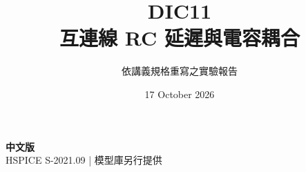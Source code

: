 \documentclass[11pt,a4paper]{article}
\title{\color{accent}DIC11\\[4pt]互連線 RC 延遲與電容耦合}
\author{依講義規格重寫之實驗報告}
\date{17 October 2026}
\begin{document}
\maketitle
\begin{center}\small\textbf{中文版}\\
HSPICE S-2021.09 \quad | \quad 模型庫另行提供
\end{center}


\end{document}
